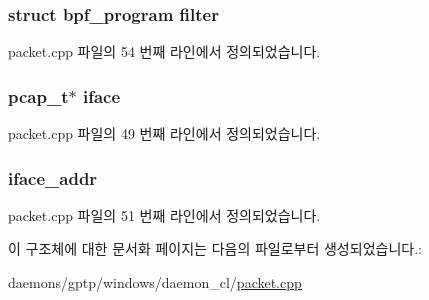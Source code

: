 \subsubsection[{\texorpdfstring{filter}{filter}}]{\setlength{\rightskip}{0pt plus 5cm}struct bpf\+\_\+program filter}\hypertarget{structpacket__handle_a4e4620e4c59a458d81a0a62a78d7c712}{}\label{structpacket__handle_a4e4620e4c59a458d81a0a62a78d7c712}


packet.\+cpp 파일의 54 번째 라인에서 정의되었습니다.

\subsubsection[{\texorpdfstring{iface}{iface}}]{\setlength{\rightskip}{0pt plus 5cm}pcap\+\_\+t$\ast$ iface}\hypertarget{structpacket__handle_ac520eed8a1cbae3624457d41e5407f1d}{}\label{structpacket__handle_ac520eed8a1cbae3624457d41e5407f1d}


packet.\+cpp 파일의 49 번째 라인에서 정의되었습니다.

\subsubsection[{\texorpdfstring{iface\+\_\+addr}{iface_addr}}]{ iface\+\_\+addr}\hypertarget{structpacket__handle_a1f4b910af694f84948acbe7e6008f524}{}\label{structpacket__handle_a1f4b910af694f84948acbe7e6008f524}


packet.\+cpp 파일의 51 번째 라인에서 정의되었습니다.



이 구조체에 대한 문서화 페이지는 다음의 파일로부터 생성되었습니다.\+:\begin{DoxyCompactItemize}
\item 
daemons/gptp/windows/daemon\+\_\+cl/\hyperlink{packet_8cpp}{packet.\+cpp}\end{DoxyCompactItemize}
